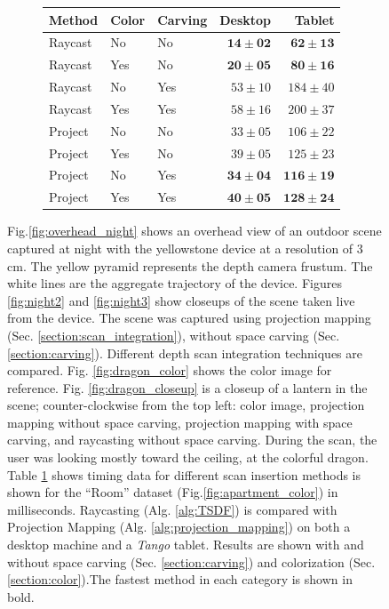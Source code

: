 \documentclass[10pt,twocolumn,letterpaper]{article}
\newcommand{\figref}[1]{Fig.\ref{#1}}
\begin{document}
\begin{figure} [htb]
\begin{subfigure}{0.35\linewidth}
\begin{tabular} { | l | l | l | r | r |}
			\hline
			Method       & Color & Carving & Desktop& Tablet\\
			\hline 
			Raycast & No& No&$\mathbf{14 \pm 02}$ & $\mathbf{62 \pm 13}$ \\ \hline
			Raycast & Yes & No& $\mathbf{20 \pm 05}$ & $\mathbf{80 \pm 16}$ \\ \hline
			Raycast & No & Yes & $53 \pm  10$ & $184 \pm 40$ \\ \hline
			Raycast & Yes & Yes &$58 \pm 16$  & $200 \pm 37$\\ \hline \hline
			Project & No & No & $33 \pm 05$ & $106 \pm 22$ \\ \hline
			Project & Yes & No & $39 \pm 05$  & $125 \pm 23$ \\ \hline
			Project  & No & Yes & $\mathbf{34 \pm 04}$  & $\mathbf{116 \pm 19}$ \\ \hline
			Project & Yes & Yes  & $\mathbf{40 \pm 05}$ & $\mathbf{128 \pm 24}$ \\ \hline
			\end{tabular}
			\caption{}
			\label{table:timing}
	 \end{subfigure} 
	 \caption{\figref{fig:overhead_night} shows an overhead view of
	 an outdoor scene captured at night with the yellowstone device at a
	 resolution of 3 cm. The yellow pyramid represents the depth camera frustum. The white
	 lines are the aggregate trajectory of the device. Figures \ref{fig:night2}
	 and \ref{fig:night3} show closeups of the scene taken live from the device.
	 The scene was captured using projection mapping (Sec.
	 \ref{section:scan_integration}), without space
	 carving (Sec. \ref{section:carving}). Different depth scan integration techniques are compared. Fig.
	 \ref{fig:dragon_color} shows the color image for reference.  Fig.
	 \ref{fig:dragon_closeup} is a closeup of a lantern in the scene; 
	 counter-clockwise from the top left: color image, projection mapping without
	 space carving, projection mapping with space carving, and raycasting without
	 space carving. During the scan, the user was looking mostly toward the
	 ceiling, at the colorful dragon. Table \ref{table:timing} shows timing data
	 for different scan insertion methods is shown for the ``Room'' dataset (\figref{fig:apartment_color}) in milliseconds. Raycasting
			(Alg. \ref{alg:TSDF}) is compared with Projection Mapping (Alg.
			\ref{alg:projection_mapping}) on both a desktop machine and a \textit{Tango}
			tablet. Results are shown with and without space carving (Sec.
			\ref{section:carving}) and colorization (Sec. \ref{section:color}).The fastest
			method in each category is shown in bold.}
	 \label{fig:device_data}
 \end{figure} 
\end{document}

